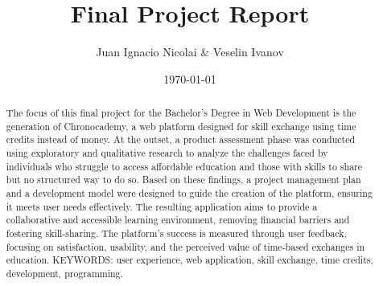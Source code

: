 \documentclass{report}
\title{Final Project Report}
\author{Juan Ignacio Nicolai \& Veselin Ivanov}
\date{\today}
\begin{document}
    \begin{abstract}
    The focus of this final project for the Bachelor’s Degree in Web Development is the generation of Chronocademy, a web platform designed for skill exchange using time credits instead of money.
    At the outset, a product assessment phase was conducted using exploratory and qualitative research to analyze the challenges faced by individuals who struggle to access affordable education and those with skills to share but no structured way to do so.
    Based on these findings, a project management plan and a development model were designed to guide the creation of the platform, ensuring it meets user needs effectively.
    The resulting application aims to provide a collaborative and accessible learning environment, removing financial barriers and fostering skill-sharing.
    The platform’s success is measured through user feedback, focusing on satisfaction, usability, and the perceived value of time-based exchanges in education.
    \newline
    \newline
    KEYWORDS: user experience, web application, skill exchange, time credits, development, programming.
    \end{abstract}

\maketitle
\tableofcontents


    

\appendix




\end{document}
